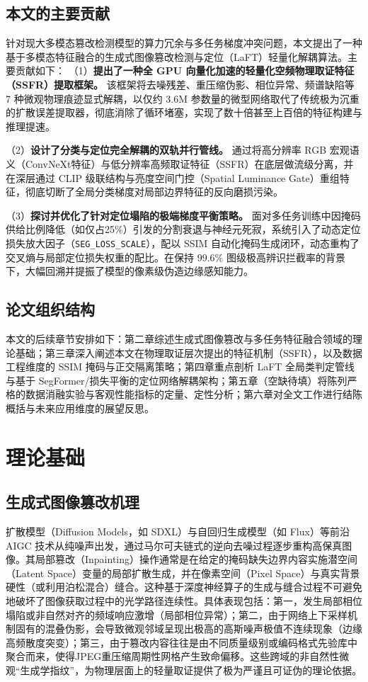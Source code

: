 \documentclass[UTF8, a4paper, 12pt]{ctexrep}
\begin{document}
\section{本文的主要贡献}
针对现大多模态篡改检测模型的算力冗余与多任务梯度冲突问题，本文提出了一种基于多模态特征融合的生成式图像篡改检测与定位（LaFT）轻量化解耦算法。主要贡献如下：
（1）\textbf{提出了一种全 GPU 向量化加速的轻量化空频物理取证特征（SSFR）提取框架。} 该框架将去噪残差、重压缩伪影、相位异常、频谱缺陷等 7 种微观物理痕迹显式解耦，以仅约 3.6M 参数量的微型网络取代了传统极为沉重的扩散误差提取器，彻底消除了循环堵塞，实现了数十倍甚至上百倍的特征构建与推理提速。

（2）\textbf{设计了分类与定位完全解耦的双轨并行管线。} 通过将高分辨率 RGB 宏观语义（ConvNeXt特征）与低分辨率高频取证特征（SSFR）在底层做流级分离，并在深层通过 CLIP 级联结构与亮度空间门控（Spatial Luminance Gate）重组特征，彻底切断了全局分类梯度对局部边界特征的反向磨损污染。

（3）\textbf{探讨并优化了针对定位塌陷的极端梯度平衡策略。} 面对多任务训练中因掩码供给比例降低（如仅占25\%）引发的分割衰退与神经元死寂，系统引入了动态定位损失放大因子（\texttt{SEG\_LOSS\_SCALE}），配以 SSIM 自动化掩码生成闭环，动态重构了交叉熵与局部定位损失权重的配比。在保持 $99.6\%$ 图级极高辨识拦截率的背景下，大幅回溯并提振了模型的像素级伪造边缘感知能力。



\section{论文组织结构}
本文的后续章节安排如下：第二章综述生成式图像篡改与多任务特征融合领域的理论基础；第三章深入阐述本文在物理取证层次提出的特征机制（SSFR），以及数据工程维度的 SSIM 掩码与正交隔离策略；第四章重点剖析 LaFT 全局类判定管线与基于 SegFormer/损失平衡的定位网络解耦架构；第五章（空缺待填）将陈列严格的数据消融实验与客观性能指标的定量、定性分析；第六章对全文工作进行结陈概括与未来应用维度的展望反思。


\chapter{理论基础}

\section{生成式图像篡改机理}
扩散模型（Diffusion Models，如 SDXL）与自回归生成模型（如 Flux）等前沿 AIGC 技术从纯噪声出发，通过马尔可夫链式的逆向去噪过程逐步重构高保真图像。其局部篡改（Inpainting）操作通常是在给定的掩码缺失边界内容实施潜空间（Latent Space）变量的局部扩散生成，并在像素空间（Pixel Space）与真实背景硬性（或利用泊松混合）缝合。这种基于深度神经算子的生成与缝合过程不可避免地破坏了图像获取过程中的光学路径连续性。具体表现包括：第一，发生局部相位塌陷或非自然对齐的频域响应激增（局部相位异常）；第二，由于网络上下采样机制固有的混叠伪影，会导致微观邻域呈现出极高的高斯噪声极值不连续现象（边缘高频散度突变）；第三，由于篡改内容往往是由不同质量级别或编码格式先验库中聚合而来，使得JPEG重压缩周期性网格产生致命偏移。这些跨域的非自然性微观“生成学指纹”，为物理层面上的轻量取证提供了极为严谨且可证伪的理论依据。
\end{document}
